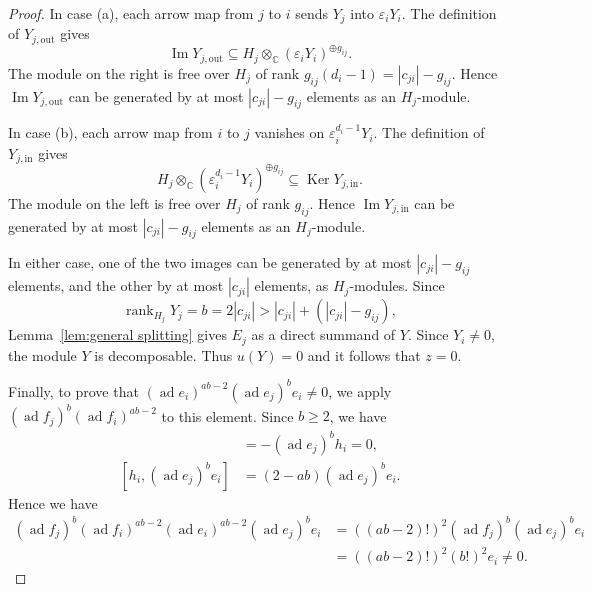 \documentclass[12pt,reqno]{amsart}
\numberwithin{equation}{section}
\theoremstyle{definition}
\theoremstyle{remark}
\newcommand{\ad}{\operatorname{ad}}
\renewcommand{\Im}{\operatorname{Im}}
\newcommand{\Ker}{\operatorname{Ker}}
\newcommand{\rank}{\operatorname{rank}}
\theoremstyle{plain}
\theoremstyle{plain}
\begin{document}
\begin{proof}
In case (a), each arrow map from $j$ to $i$ sends $Y_j$ into $\varepsilon_iY_i$. The definition of $Y_{j,\mathrm{out}}$ gives
\[
    \Im Y_{j,\mathrm{out}}
    \subseteq H_j\otimes_{\mathbb C}
    (\varepsilon_iY_i)^{\oplus g_{ij}}.
\]
The module on the right is free over $H_j$ of rank $g_{ij}(d_i-1)=|c_{ji}|-g_{ij}$. Hence $\Im Y_{j,\mathrm{out}}$ can be generated by at most $|c_{ji}|-g_{ij}$ elements as an $H_j$-module.

In case (b), each arrow map from $i$ to $j$ vanishes on $\varepsilon_i^{d_i-1}Y_i$. The definition of $Y_{j,\mathrm{in}}$ gives
\[
    H_j\otimes_{\mathbb C}
    (\varepsilon_i^{d_i-1}Y_i)^{\oplus g_{ij}}
    \subseteq\Ker Y_{j,\mathrm{in}}.
\]
The module on the left is free over $H_j$ of rank $g_{ij}$. Hence $\Im Y_{j,\mathrm{in}}$ can be generated by at most $|c_{ji}|-g_{ij}$ elements as an $H_j$-module.

In either case, one of the two images can be generated by at most $|c_{ji}|-g_{ij}$ elements, and the other by at most $|c_{ji}|$ elements, as $H_j$-modules. Since
\[
    \rank_{H_j}Y_j=b=2|c_{ji}|
    >|c_{ji}|+(|c_{ji}|-g_{ij}),
\]
Lemma~\ref{lem:general splitting} gives $E_j$ as a direct summand of $Y$. Since $Y_i\ne0$, the module $Y$ is decomposable. Thus $u(Y)=0$ and it follows that $z=0$.

Finally, to prove that $(\ad e_i)^{ab-2}(\ad e_j)^b e_i\ne0$, we apply
$(\ad f_j)^b(\ad f_i)^{ab-2}$ to this element. Since $b\ge2$, we have
\begin{align*}
    [f_i,(\ad e_j)^b e_i]&=-(\ad e_j)^b h_i=0,\\
    [h_i,(\ad e_j)^b e_i] &=(2-ab)(\ad e_j)^b e_i.
\end{align*}
Hence we have
\begin{align*}
    (\ad f_j)^b(\ad f_i)^{ab-2}(\ad e_i)^{ab-2}(\ad e_j)^b e_i&=((ab-2)!)^2
  (\ad f_j)^b(\ad e_j)^b e_i\\
&=((ab-2)!)^2(b!)^2e_i\ne0.
\end{align*}
\end{proof}
\end{document}
